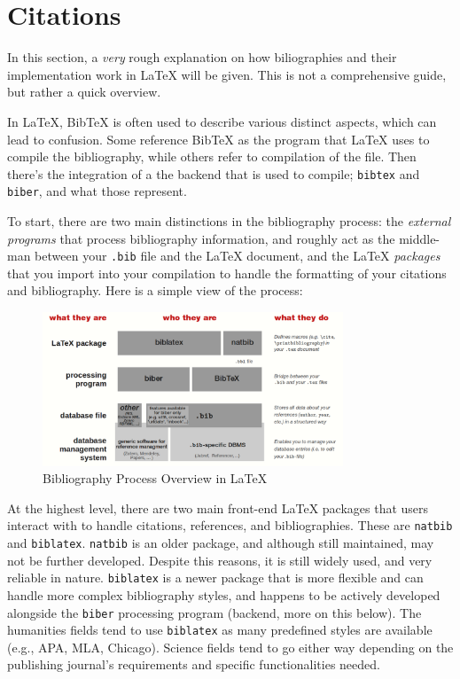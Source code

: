 \section{Citations}
\label{sec: citations}

In this section, a \emph{very} rough explanation on how biliographies and their implementation work in LaTeX will be given. This is not a comprehensive guide, but rather a quick overview.

In LaTeX, BibTeX is often used to describe various distinct aspects, which can lead to confusion. Some reference BibTeX as the program that LaTeX uses to compile the bibliography, while others refer to compilation of the file. Then there's the integration of a the backend that is used to compile; \texttt{bibtex} and \texttt{biber}, and what those represent.

To start, there are two main distinctions in the bibliography process: the \emph{external programs} that process bibliography information, and roughly act as the middle-man between your \texttt{.bib} file and the LaTeX document, and the LaTeX \emph{packages} that you import into your compilation to handle the formatting of your citations and bibliography. Here is a simple view of the process:

\begin{figure}[h!]
    \centering
    \includegraphics[width=0.8\textwidth]{content/citations_overview.png}
    \caption{Bibliography Process Overview in LaTeX}
    \label{fig: bibliography-process}
\end{figure}

At the highest level, there are two main front-end LaTeX packages that users interact with to handle citations, references, and bibliographies. These are \texttt{natbib} and \texttt{biblatex}. \texttt{natbib} is an older package, and although still maintained, may not be further developed. Despite this reasons, it is still widely used, and very reliable in nature. 
\texttt{biblatex} is a newer package that is more flexible and can handle more complex bibliography styles, and happens to be actively developed alongside the \texttt{biber} processing program (backend, more on this below). The humanities fields tend to use \texttt{biblatex} as many predefined styles are available (e.g., APA, MLA, Chicago). Science fields tend to go either way depending on the publishing journal's requirements and specific functionalities needed.

